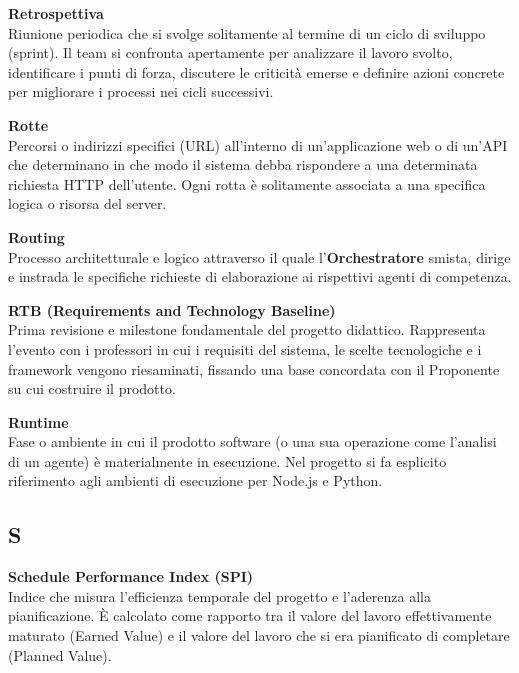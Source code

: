 \documentclass[12pt, a4paper]{article}
\begin{document}
\noindent\hypertarget{retrospettiva}{\textbf{Retrospettiva}} \\[0.1em]
Riunione periodica che si svolge solitamente al termine di un ciclo di sviluppo (sprint). Il team si confronta apertamente per analizzare il lavoro svolto, identificare i punti di forza, discutere le criticità emerse e definire azioni concrete per migliorare i processi nei cicli successivi.
\vspace{0.5cm}

\noindent\hypertarget{rotte}{\textbf{Rotte}} \\[0.1em]
Percorsi o indirizzi specifici (URL) all'interno di un'applicazione web o di un'API che determinano in che modo il sistema debba rispondere a una determinata richiesta HTTP dell'utente. Ogni rotta è solitamente associata a una specifica logica o risorsa del server.
\vspace{0.5cm}

\noindent\hypertarget{routing}{\textbf{Routing}} \\[0.1em]
Processo architetturale e logico attraverso il quale l'\textbf{Orchestratore} smista, dirige e instrada le specifiche richieste di elaborazione ai rispettivi agenti di competenza.
\vspace{0.5cm}  

\noindent\hypertarget{rtb}{\textbf{RTB (Requirements and Technology Baseline)}} \\[0.1em]
Prima revisione e milestone fondamentale del progetto didattico. Rappresenta l'evento con i professori in cui i requisiti del sistema, le scelte tecnologiche e i framework vengono riesaminati, fissando una base concordata con il Proponente su cui costruire il prodotto.
\vspace{0.1cm}

\noindent\hypertarget{runtime}{\textbf{Runtime}} \\[0.1em]
Fase o ambiente in cui il prodotto software (o una sua operazione come l'analisi di un agente) è materialmente in esecuzione. Nel progetto si fa esplicito riferimento agli ambienti di esecuzione per Node.js e Python.
\vspace{0.5cm}  

\newpage
\subsection*{S}
{}
\vspace{0.2cm}

\noindent\hypertarget{schedule-performance-index}{\textbf{Schedule Performance Index (SPI)}} \\[0.1em]
Indice che misura l'efficienza temporale del progetto e l'aderenza alla pianificazione. È calcolato come rapporto tra il valore del lavoro effettivamente maturato (Earned Value) e il valore del lavoro che si era pianificato di completare (Planned Value).
\vspace{0.5cm}
\end{document}
